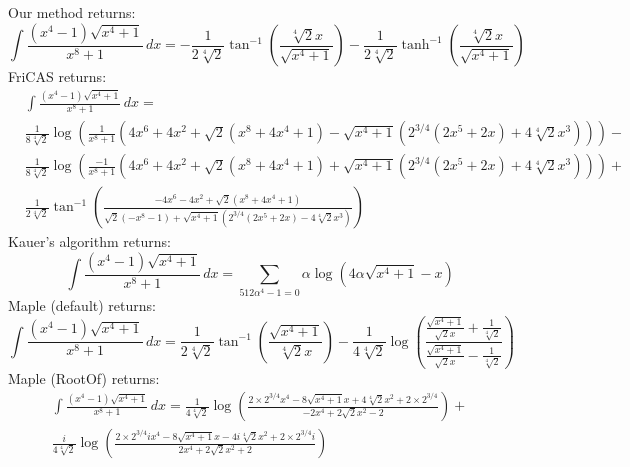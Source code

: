 \documentclass[12pt]{article}
\numberwithin{equation}{section}
\theoremstyle{definition}
\begin{document}
Our method returns:
\small
\begin{equation*}
\int \frac{\left(x^4-1\right) \sqrt{x^4+1}}{x^8+1} \, dx= 
-\frac{1}{2 \sqrt[4]{2}}\tan ^{-1}\left(\frac{\sqrt[4]{2} x}{\sqrt{x^4+1}}\right) - 
\frac{1}{2 \sqrt[4]{2}}\tanh^{-1}\left(\frac{\sqrt[4]{2} x}{\sqrt{x^4+1}}\right)
\end{equation*}
\normalsize
FriCAS returns:
\small
\begin{align*}
& \int \frac{\left(x^4-1\right) \sqrt{x^4+1}}{x^8+1} \, dx = \\
& \frac{1}{8 \sqrt[4]{2}}\log\left(\frac{1}{x^8+1}\left(4 x^6+4 x^2+\sqrt{2} \left(x^8+4x^4+1\right)
-\sqrt{x^4+1} \left(2^{3/4} \left(2 x^5+2 x\right)+4 \sqrt[4]{2} x^3\right)\right)\right) - \\
&\frac{1}{8 \sqrt[4]{2}}\log \left(\frac{-1}{x^8+1}\left(4x^6+4 x^2+\sqrt{2} \left(x^8+4 x^4+1\right)+
\sqrt{x^4+1} \left(2^{3/4} \left(2 x^5+2 x\right)+4 \sqrt[4]{2} x^3\right)\right)\right) + \\
& \frac{1}{2\sqrt[4]{2}}\tan ^{-1}\left(\frac{-4 x^6-4 x^2+\sqrt{2} \left(x^8+4 x^4+1\right)}{\sqrt{2} \left(-x^8-1\right)+\sqrt{x^4+1} \left(2^{3/4} \left(2x^5+2 x\right)-4 \sqrt[4]{2} x^3\right)}\right)
\end{align*}
\normalsize
Kauer's algorithm returns: 
\small
$$\int \frac{\left(x^4-1\right) \sqrt{x^4+1}}{x^8+1} \, dx = 
\sum_{512 \alpha ^4-1=0}\alpha  \log \left(4 \alpha  \sqrt{x^4+1}-x\right)$$
\normalsize
Maple (default) returns:
\small
$$\int \frac{\left(x^4-1\right) \sqrt{x^4+1}}{x^8+1} \, dx = 
\frac{1}{2 \sqrt[4]{2}} \tan ^{-1}\left(\frac{\sqrt{x^4+1}}{\sqrt[4]{2} x}\right) - 
\frac{1}{4 \sqrt[4]{2}} \log\left(\frac{\frac{\sqrt{x^4+1}}{\sqrt{2} x}+\frac{1}{\sqrt[4]{2}}}{\frac{\sqrt{x^4+1}}{\sqrt{2} x}-\frac{1}{\sqrt[4]{2}}}\right)$$
\normalsize
Maple (RootOf) returns:
\small
\begin{multline*}
\int \frac{\left(x^4-1\right) \sqrt{x^4+1}}{x^8+1} \, dx = 
\frac{1}{4 \sqrt[4]{2}}\log \left(\frac{2\times2^{3/4} x^4-8 \sqrt{x^4+1} x+4 \sqrt[4]{2} x^2+2\times2^{3/4}}{-2 x^4+2 \sqrt{2} x^2-2}\right) + \\
\frac{i}{4 \sqrt[4]{2}}\log \left(\frac{2\times2^{3/4} i x^4-8 \sqrt{x^4+1} x-4 i \sqrt[4]{2} x^2+2\times2^{3/4} i}{2 x^4+2 \sqrt{2} x^2+2}\right)
\end{multline*}
\end{document}

